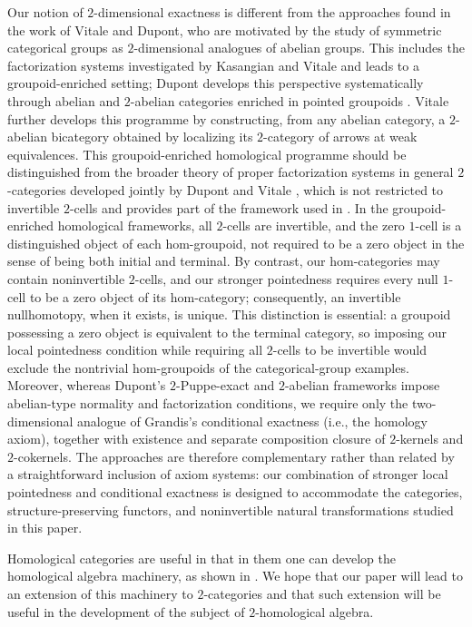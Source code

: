 \documentclass[11pt,reqno,a4paper]{amsart}
\theoremstyle{definition}
\theoremstyle{remark}
\newcommand{\0}{\mathbf{0}}
\renewcommand{\1}{\mathbf{1}}
\begin{document}
Our notion of $2$-dimensional exactness is different from the approaches found in the work of Vitale
and Dupont, who are motivated by the study of symmetric categorical groups as
$2$-dimensional analogues of abelian groups. This includes the
factorization systems investigated by Kasangian and Vitale
\cite{KasangianVitale} and leads to a groupoid-enriched setting; Dupont
develops this perspective systematically through abelian and
$2$-abelian categories enriched in pointed groupoids \cite{Dupont}.
Vitale \cite{Vitale2024} further develops this programme by
constructing, from any abelian category, a $2$-abelian bicategory
obtained by localizing its $2$-category of arrows at weak equivalences.
This groupoid-enriched homological programme should be distinguished
from the broader theory of proper factorization systems in general
$2$-categories developed jointly by Dupont and Vitale
\cite{DupontVitale}, which is not restricted to invertible $2$-cells
and provides part of the framework used in \cite{CJM}. In the
groupoid-enriched homological frameworks, all $2$-cells are
invertible, and the zero $1$-cell is a distinguished object of each
hom-groupoid, not required to be a zero object in the sense of being
both initial and terminal. By contrast, our hom-categories may
contain noninvertible $2$-cells, and our stronger pointedness
requires every null $1$-cell to be a zero object of its hom-category;
consequently, an invertible nullhomotopy, when it exists, is unique.
This distinction is essential: a groupoid possessing a zero object
is equivalent to the terminal category, so imposing our local
pointedness condition while requiring all $2$-cells to be invertible
would exclude the nontrivial hom-groupoids of the categorical-group
examples. Moreover, whereas Dupont's $2$-Puppe-exact and
$2$-abelian frameworks impose abelian-type normality and
factorization conditions, we require only the two-dimensional
analogue of Grandis's conditional exactness (i.e., the homology axiom), together with
existence and separate composition closure of $2$-kernels and
$2$-cokernels. The approaches are therefore complementary rather
than related by a straightforward inclusion of axiom systems:
our combination of stronger local pointedness and conditional
exactness is designed to accommodate the categories,
structure-preserving functors, and noninvertible natural
transformations studied in this paper.

Homological categories are useful in that in them one can develop the homological algebra machinery, as shown in \cite{Grandis13}.
We hope that our paper will lead to an extension of this machinery to $2$-categories and that such extension will be useful in the development of the subject of $2$-homological algebra.
\end{document}
